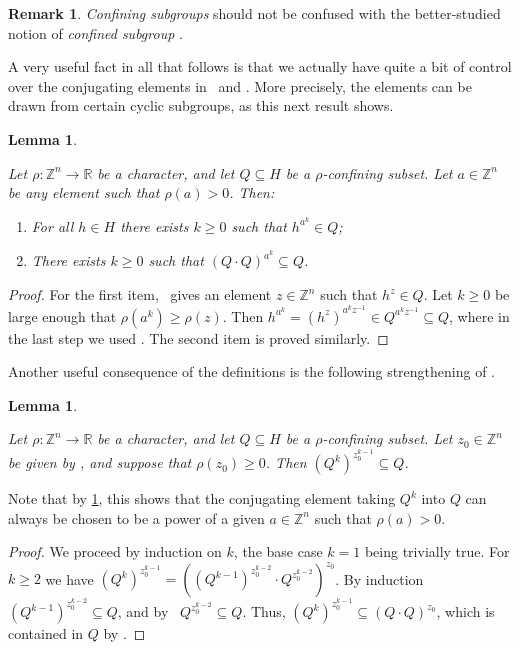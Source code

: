 \documentclass[reqno,12pt]{amsart}\setcounter{tocdepth}{1}
\newtheorem{lemma}[theorem]{Lemma}
\theoremstyle{definition}
\newtheorem{remark}[theorem]{Remark}
\newcommand{\Z}{\mathbb{Z}}
\newcommand{\R}{\mathbb{R}}
\numberwithin{equation}{section}
\begin{document}
\begin{remark}
    \emph{Confining subgroups} should not be confused with the better-studied notion of \emph{confined subgroup} \cite{confined:subgroup}.
\end{remark}

A very useful fact in all that follows is that we actually have quite a bit of control over the conjugating elements in \GetInConf\ and \ProdConf. More precisely, the elements can be drawn from certain cyclic subgroups, as this next result shows.

\begin{lemma}
\label{lem:conf:cyclic}

Let $\rho \colon \Z^n \to \R$ be a character, and let $Q \subseteq H$ be a $\rho$-confining subset. Let $a \in \Z^n$ be any element such that $\rho(a) > 0$. Then:
\begin{enumerate}
\item For all $h \in H$ there exists $k \geq 0$ such that $h^{a^k} \in Q$;
\item There exists $k \geq 0$ such that $(Q \cdot Q)^{a^k} \subseteq Q$.
\end{enumerate}
\end{lemma}

\begin{proof}
For the first item, \GetInConf\ gives an element $z \in \Z^n$ such that $h^z \in Q$. Let $k \geq 0$ be large enough that $\rho(a^k) \geq \rho(z)$. Then $h^{a^k} = (h^z)^{a^k z^{-1}} \in Q^{a^k z^{-1}} \subseteq Q$, where in the last step we used \StayInConf. The second item is proved similarly.
\end{proof}

Another useful consequence of the definitions is the following strengthening of \ProdConf.

\begin{lemma}
\label{lem:products}

Let $\rho \colon \Z^n \to \R$ be a character, and let $Q \subseteq H$ be a $\rho$-confining subset. Let $z_0 \in \Z^n$ be given by \ProdConf, and suppose that $\rho(z_0) \geq 0$. Then $(Q^k)^{z_0^{k-1}} \subseteq Q$.
\end{lemma}

Note that by \cref{lem:conf:cyclic}, this shows that the conjugating element taking $Q^k$ into $Q$ can always be chosen to be a power of a given $a \in \Z^n$ such that $\rho(a) > 0$.

\begin{proof}
We proceed by induction on $k$, the base case $k=1$ being trivially true. For $k\ge 2$ we have $(Q^k)^{z_0^{k-1}} = ((Q^{k-1})^{z_0^{k-2}} \cdot Q^{z_0^{k-2}})^{z_0}$. By induction $(Q^{k-1})^{z_0^{k-2}}\subseteq Q$, and by \StayInConf\ $Q^{z_0^{k-2}}\subseteq Q$. Thus, $(Q^k)^{z_0^{k-1}}\subseteq (Q \cdot Q)^{z_0}$, which is contained in $Q$ by \ProdConf.
\end{proof}
\end{document}
